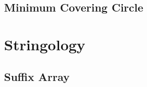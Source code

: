 \documentclass[a4paper,10pt,twocolumn,oneside]{article}
\begin{document}
%

%

\subsection{Minimum Covering Circle}


%

%

%

\section{Stringology}
\subsection{Suffix Array}


%

%
\end{document}
